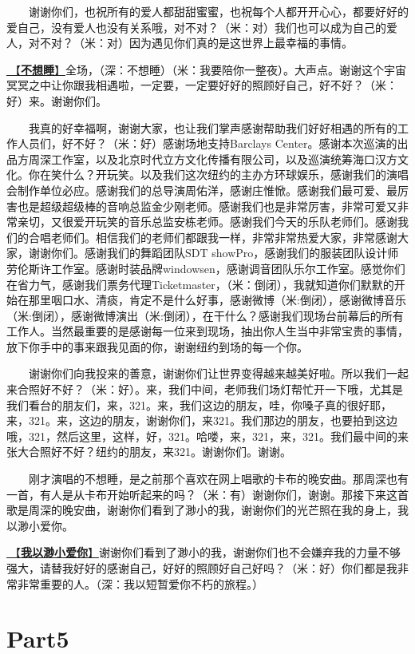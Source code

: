 \documentclass[]{ctexbook}
\begin{document}
  谢谢你们，也祝所有的爱人都甜甜蜜蜜，也祝每个人都开开心心，都要好好的爱自己，没有爱人也没有关系哦，对不对？（米：对）我们也可以成为自己的爱人，对不对？（米：对）因为遇见你们真的是这世界上最幸福的事情。

\hyperref[donot-want-to-sleep]{🎵【\textbf{不想睡}】}全场，（深：不想睡）（米：我要陪你一整夜）。大声点。谢谢这个宇宙冥冥之中让你跟我相遇啦，一定要，一定要好好的照顾好自己，好不好？（米：好）来。谢谢你们。

  我真的好幸福啊，谢谢大家，也让我们掌声感谢帮助我们好好相遇的所有的工作人员们，好不好？（米：好）感谢场地支持Barclays Center。感谢本次巡演的出品方周深工作室，以及北京时代立方文化传播有限公司，以及巡演统筹海口汉方文化。你在笑什么？开玩笑。以及我们这次纽约的主办方环球娱乐，感谢我们的演唱会制作单位必应。感谢我们的总导演周佑洋，感谢庄惟惞。感谢我们最可爱、最厉害也是超级超级棒的音响总监金少刚老师。感谢我们也是非常厉害，非常可爱又非常亲切，又很爱开玩笑的音乐总监安栋老师。感谢我们今天的乐队老师们。感谢我们的合唱老师们。相信我们的老师们都跟我一样，非常非常热爱大家，非常感谢大家，谢谢你们。感谢我们的舞蹈团队SDT showPro，感谢我们的服装团队设计师劳伦斯许工作室。感谢时装品牌windowsen，感谢调音团队乐尔工作室。感觉你们在省力气，感谢我们票务代理Ticketmaster，（米：倒闭），我就知道你们默默的开始在那里咽口水、清痰，肯定不是什么好事，感谢微博（米:倒闭），感谢微博音乐（米:倒闭），感谢微博演出（米:倒闭），在干什么？感谢我们现场台前幕后的所有工作人。当然最重要的是感谢每一位来到现场，抽出你人生当中非常宝贵的事情，放下你手中的事来跟我见面的你，谢谢纽约到场的每一个你。

  谢谢你们向我投来的善意，谢谢你们让世界变得越来越美好啦。所以我们一起来合照好不好？（米：好）。来，我们中间，老师我们场灯帮忙开一下哦，尤其是我们看台的朋友们，来，321。来，我们这边的朋友，哇，你嗓子真的很好耶，来，321。来，这边的朋友，谢谢你们，来321。我们那边的朋友，也要拍到这边哦，321，然后这里，这样，好，321。哈喽，来，321，来，321。我们最中间的来张大合照好不好？纽约的朋友，来321。谢谢你们。谢谢。

  刚才演唱的不想睡，是之前那个喜欢在网上唱歌的卡布的晚安曲。那周深也有一首，有人是从卡布开始听起来的吗？（米：有）谢谢你们，谢谢。那接下来这首歌是周深的晚安曲，谢谢你们看到了渺小的我，谢谢你们的光芒照在我的身上，我以渺小爱你。

\hyperref[loving-you-in-my-humble-way]{🎵【\textbf{我以渺小爱你}】}谢谢你们看到了渺小的我，谢谢你们也不会嫌弃我的力量不够强大，请替我好好的感谢自己，好好的照顾好自己好吗？（米：好）你们都是我非常非常重要的人。（深：我以短暂爱你不朽的旅程。）

\section{Part5}\label{NewYork-20250309-part5}
\end{document}
